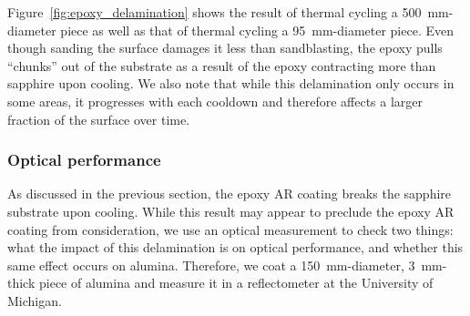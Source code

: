 Figure~\ref{fig:epoxy_delamination} shows the result of thermal cycling a 500~mm-diameter piece as well as that of thermal cycling a 95~mm-diameter piece. Even though sanding the surface damages it less than sandblasting, the epoxy pulls ``chunks'' out of the substrate as a result of the epoxy contracting more than sapphire upon cooling. We also note that while this delamination only occurs in some areas, it progresses with each cooldown and therefore affects a larger fraction of the surface over time.


\subsubsection{Optical performance}
\label{sec:sapphire_ar_coating_epoxy_optical_peformance}

As discussed in the previous section, the epoxy AR coating breaks the sapphire substrate upon cooling. While this result may appear to preclude the epoxy AR coating from consideration, we use an optical measurement to check two things: what the impact of this delamination is on optical performance, and whether this same effect occurs on alumina. Therefore, we coat a 150~mm-diameter, 3~mm-thick piece of alumina and measure it in a reflectometer at the University of Michigan.


